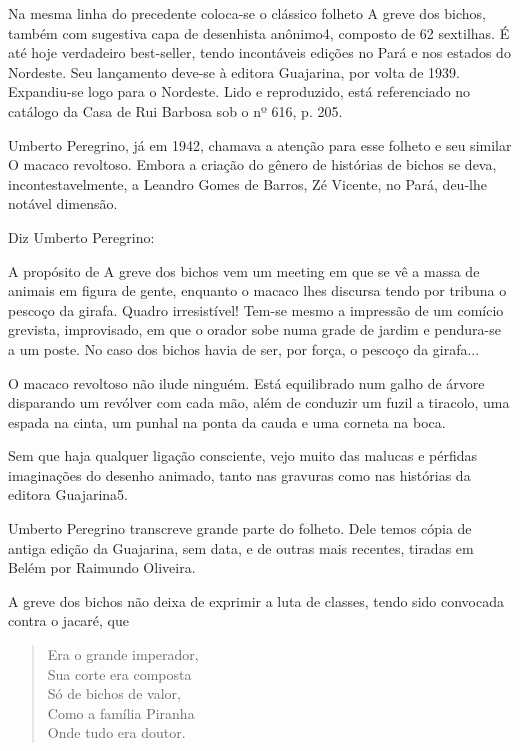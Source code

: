 Na mesma linha do precedente coloca-se o clássico folheto A greve dos
bichos, também com sugestiva capa de desenhista anônimo4, composto de
62 sextilhas. É até hoje verdadeiro best-seller, tendo incontáveis
edições no Pará e nos estados do Nordeste. Seu lançamento deve-se à
editora Guajarina, por volta de 1939. Expandiu-se logo para o
Nordeste. Lido e reproduzido, está referenciado no catálogo da Casa
de Rui Barbosa sob o nº 616, p. 205.

Umberto Peregrino, já em 1942, chamava a atenção para esse folheto e
seu similar O macaco revoltoso. Embora a criação do gênero de
histórias de bichos se deva, incontestavelmente, a Leandro Gomes de
Barros, Zé Vicente, no Pará, deu-lhe notável dimensão.

Diz Umberto Peregrino:

\begin{hedraquote}
A propósito de A greve dos bichos vem um meeting em que se vê a massa
de animais em figura de gente, enquanto o macaco lhes discursa tendo
por tribuna o pescoço da girafa. Quadro irresistível! Tem-se mesmo a
impressão de um comício grevista, improvisado, em que o orador sobe
numa grade de jardim e pendura-se a um poste. No caso dos bichos
havia de ser, por força, o pescoço da girafa...

O macaco revoltoso não ilude ninguém. Está equilibrado num galho de
árvore disparando um revólver com cada mão, além de conduzir um fuzil
a tiracolo, uma espada na cinta, um punhal na ponta da cauda e uma
corneta na boca.

Sem que haja qualquer ligação consciente, vejo muito das malucas e
pérfidas imaginações do desenho animado, tanto nas gravuras como nas
histórias da editora Guajarina5. 
\end{hedraquote}

Umberto Peregrino transcreve grande parte do folheto. Dele temos cópia
de antiga edição da Guajarina, sem data, e de outras mais recentes,
tiradas em Belém por Raimundo Oliveira. 

A greve dos bichos não deixa de exprimir a luta de classes, tendo sido
convocada contra o jacaré, que

\begin{verse}
Era o grande imperador,\\
Sua corte era composta \\
Só de bichos de valor,\\		
Como a família Piranha\\
Onde tudo era doutor.
\end{verse}

